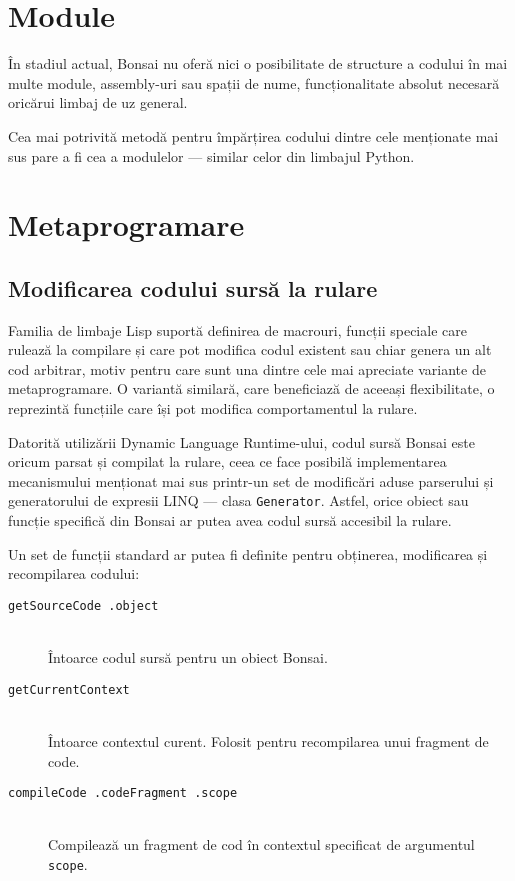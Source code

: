 \documentclass[12pt,a4paper]{memoir}
\renewcommand{\c}{\texttt}
\begin{document}
\section{Module}

În stadiul actual, Bonsai nu oferă nici o posibilitate de structure a codului în mai multe module, assembly-uri sau spații de nume, funcționalitate absolut necesară oricărui limbaj de uz general.

Cea mai potrivită metodă pentru împărțirea codului dintre cele menționate mai sus pare a fi cea a modulelor — similar celor din limbajul Python. 

\section{Metaprogramare}

\subsection{Modificarea codului sursă la rulare} 

Familia de limbaje Lisp suportă definirea de macrouri, funcții speciale care rulează la compilare și care pot modifica codul existent sau chiar genera un alt cod arbitrar, motiv pentru care sunt una dintre cele mai apreciate variante de metaprogramare. O variantă similară, care beneficiază de aceeași flexibilitate, o reprezintă funcțiile care își pot modifica comportamentul la rulare. 

Datorită utilizării Dynamic Language Runtime-ului, codul sursă Bonsai este oricum parsat și compilat la rulare, ceea ce face posibilă implementarea mecanismului menționat mai sus printr-un set de modificări aduse parserului și generatorului de expresii LINQ — clasa \c{Generator}. Astfel, orice obiect sau funcție specifică din Bonsai ar putea avea codul sursă accesibil la rulare. 

Un set de funcții standard ar putea fi definite pentru obținerea, modificarea și recompilarea codului:

\begin{description}
\item[\c{getSourceCode .object}]\hfill\\ Întoarce codul sursă pentru un obiect Bonsai.
\item[\c{getCurrentContext}]\hfill\\ Întoarce contextul curent. Folosit pentru recompilarea unui fragment de code.
\item[\c{compileCode .codeFragment .scope}]\hfill\\ Compilează un fragment de cod în contextul specificat de argumentul \c{scope}. 
\end{description}
\end{document}
